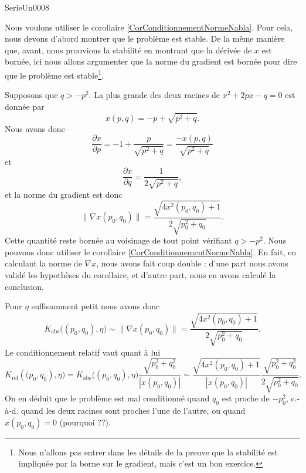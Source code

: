 
\begin{corrige}{SerieUn0008}

	Nous voulons utiliser le corollaire \ref{CorConditionnementNormeNabla}. Pour cela, nous devons d'abord montrer que le problème est stable. De la même manière que, avant, nous prouvions la stabilité en montrant que la dérivée de $x$ est bornée, ici nous allons argumenter que la norme du gradient est bornée pour dire que le problème est stable\footnote{Nous n'allons pas entrer dans les détails de la preuve que la stabilité est impliquée par la borne sur le gradient, mais c'est un bon exercice.}.

	Supposons que $q > -p^2$. La plus grande des deux racines de $x^2 + 2px - q = 0$ est donnée par
	\begin{equation}
		x(p,q) = -p + \sqrt{p^2+q}.
	\end{equation}
	Nous avons donc
	\begin{equation}
		\frac{\partial x}{\partial p} = -1 + \frac{p}{\sqrt{p^2+q}} = \frac{-x(p,q)}{\sqrt{p^2+q}}
	\end{equation}
	et
	\begin{equation}
		\frac{\partial x}{\partial q} = \frac{1}{2\sqrt{p^2+q}},
	\end{equation}
	et la norme du gradient est donc
	\begin{equation}
		\| \nabla x(p_0,q_0) \| = \frac{\sqrt{4 x^2(p_0,q_0)+1}}{2\sqrt{p_0^2+q_0}}.
	\end{equation}
	Cette quantité reste bornée au voisinage de tout point vérifiant $q>-p^2$. Nous pouvons donc utiliser le corollaire \ref{CorConditionnementNormeNabla}. En fait, en calculant la norme de $\nabla x$, nous avons fait coup double : d'une part nous avons validé les hypothèses du corollaire, et d'autre part, nous en avons calculé la conclusion.

	Pour $\eta$ suffisamment petit nous avons donc
	\begin{equation}
		K_{\text{abs}}\big((p_0,q_0),\eta\big) \sim \| \nabla x(p_0,q_0) \| = \frac{\sqrt{4 x^2(p_0,q_0)+1}}{2\sqrt{p_0^2+q_0}}.
	\end{equation}
	Le conditionnement relatif vaut quant à lui
	\begin{equation}
		K_{\text{rel}}(\big(p_0,q_0),\eta\big) = K_{\text{abs}}\big((p_0,q_0),\eta\big) \frac{\sqrt{p_0^2+q_0^2}}{|x(p_0,q_0)|} \sim \frac{\sqrt{4 x^2(p_0,q_0)+1}}{|x(p_0,q_0)|}\frac{\sqrt{p_0^2+q_0^2}}{2\sqrt{p_0^2+q_0}}.
	\end{equation}
	On en déduit que le problème est mal conditionné quand $q_0$ est proche de $-p_0^2$, c.-à-d. quand les deux racines sont proches l'une de l'autre, ou quand $x(p_0,q_0) = 0$ (pourquoi ??).

\end{corrige}
